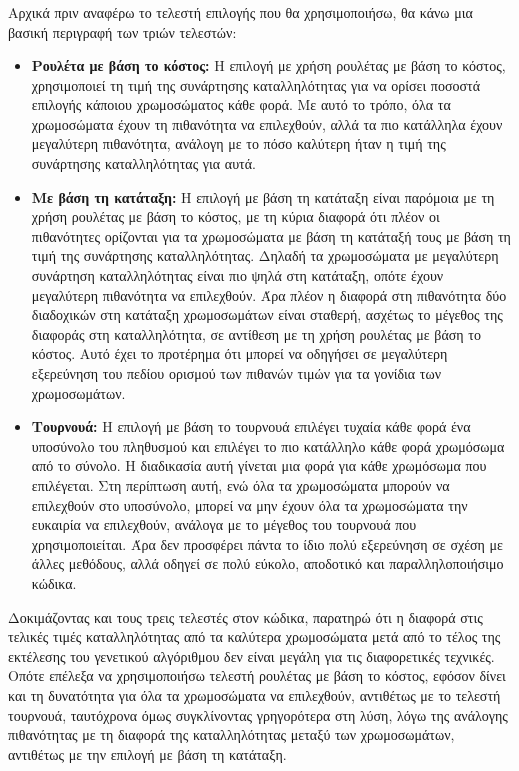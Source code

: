 \documentclass[12pt,a4paper]{article}
\begin{document}
\subsubsection{}

Αρχικά πριν αναφέρω το τελεστή επιλογής που θα χρησιμοποιήσω, θα κάνω μια βασική περιγραφή των τριών τελεστών:

\begin{itemize}
    \item \textbf{Ρουλέτα με βάση το κόστος:} Η επιλογή με χρήση ρουλέτας με βάση το κόστος, χρησιμοποιεί τη τιμή της συνάρτησης καταλληλότητας για να ορίσει ποσοστά επιλογής κάποιου χρωμοσώματος κάθε φορά. Με αυτό το τρόπο, όλα τα χρωμοσώματα έχουν τη πιθανότητα να επιλεχθούν, αλλά τα πιο κατάλληλα έχουν μεγαλύτερη πιθανότητα, ανάλογη με το πόσο καλύτερη ήταν η τιμή της συνάρτησης καταλληλότητας για αυτά.

    \item \textbf{Με βάση τη κατάταξη:} Η επιλογή με βάση τη κατάταξη είναι παρόμοια με τη χρήση ρουλέτας με βάση το κόστος, με τη κύρια διαφορά ότι πλέον οι πιθανότητες ορίζονται για τα χρωμοσώματα με βάση τη κατάταξή τους με βάση τη τιμή της συνάρτησης καταλληλότητας. Δηλαδή τα χρωμοσώματα με μεγαλύτερη συνάρτηση καταλληλότητας είναι πιο ψηλά στη κατάταξη, οπότε έχουν μεγαλύτερη πιθανότητα να επιλεχθούν. Άρα πλέον η διαφορά στη πιθανότητα δύο διαδοχικών στη κατάταξη χρωμοσωμάτων είναι σταθερή, ασχέτως το μέγεθος της διαφοράς στη καταλληλότητα, σε αντίθεση με τη χρήση ρουλέτας με βάση το κόστος. Αυτό έχει το προτέρημα ότι μπορεί να οδηγήσει σε μεγαλύτερη εξερεύνηση του πεδίου ορισμού των πιθανών τιμών για τα γονίδια των χρωμοσωμάτων.

    \item \textbf{Τουρνουά:} Η επιλογή με βάση το τουρνουά επιλέγει τυχαία κάθε φορά ένα υποσύνολο του πληθυσμού και επιλέγει το πιο κατάλληλο κάθε φορά χρωμόσωμα από το σύνολο. Η διαδικασία αυτή γίνεται μια φορά για κάθε χρωμόσωμα που επιλέγεται. Στη περίπτωση αυτή, ενώ όλα τα χρωμοσώματα μπορούν να επιλεχθούν στο υποσύνολο, μπορεί να μην έχουν όλα τα χρωμοσώματα την ευκαιρία να επιλεχθούν, ανάλογα με το μέγεθος του τουρνουά που χρησιμοποιείται. Άρα δεν προσφέρει πάντα το ίδιο πολύ εξερεύνηση σε σχέση με άλλες μεθόδους, αλλά οδηγεί σε πολύ εύκολο, αποδοτικό και παραλληλοποιήσιμο κώδικα.
\end{itemize}

Δοκιμάζοντας και τους τρεις τελεστές στον κώδικα, παρατηρώ ότι η διαφορά στις τελικές τιμές καταλληλότητας από τα καλύτερα χρωμοσώματα μετά από το τέλος της εκτέλεσης του γενετικού αλγόριθμου δεν είναι μεγάλη για τις διαφορετικές τεχνικές. Οπότε επέλεξα να χρησιμοποιήσω τελεστή ρουλέτας με βάση το κόστος, εφόσον δίνει και τη δυνατότητα για όλα τα χρωμοσώματα να επιλεχθούν, αντιθέτως με το τελεστή τουρνουά, ταυτόχρονα όμως συγκλίνοντας γρηγορότερα στη λύση, λόγω της ανάλογης πιθανότητας με τη διαφορά της καταλληλότητας μεταξύ των χρωμοσωμάτων, αντιθέτως με την επιλογή με βάση τη κατάταξη.
\end{document}
